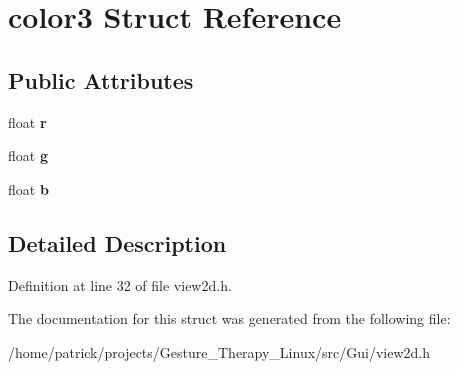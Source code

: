 \hypertarget{structcolor3}{}\section{color3 Struct Reference}
\label{structcolor3}
\subsection*{Public Attributes}
\begin{DoxyCompactItemize}
\item 
\mbox{\label{structcolor3_a21e2abe2de9cbae325a85a00783a6f94}} 
float {\bfseries r}
\item 
\mbox{\label{structcolor3_a22588868ceac5fda624b3cc6fc901607}} 
float {\bfseries g}
\item 
\mbox{\label{structcolor3_a7a714589ca1f1edf696028c00ababe6d}} 
float {\bfseries b}
\end{DoxyCompactItemize}


\subsection{Detailed Description}


Definition at line 32 of file view2d.\+h.



The documentation for this struct was generated from the following file\+:\begin{DoxyCompactItemize}
\item 
/home/patrick/projects/\+Gesture\+\_\+\+Therapy\+\_\+\+Linux/src/\+Gui/view2d.\+h\end{DoxyCompactItemize}
